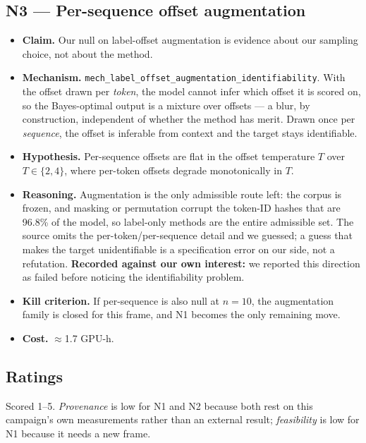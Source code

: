 \documentclass{article}
\begin{document}
\subsection{N3 --- Per-sequence offset augmentation}
\begin{itemize}
\item \textbf{Claim.} Our null on label-offset augmentation is evidence about our sampling choice, not about the method.
\item \textbf{Mechanism.} \texttt{mech\_label\_offset\_augmentation\_identifiability}. With the offset drawn per \emph{token}, the model cannot infer which offset it is scored on, so the Bayes-optimal output is a mixture over offsets --- a blur, by construction, independent of whether the method has merit. Drawn once per \emph{sequence}, the offset is inferable from context and the target stays identifiable.
\item \textbf{Hypothesis.} Per-sequence offsets are flat in the offset temperature $T$ over $T\in\{2,4\}$, where per-token offsets degrade monotonically in $T$.
\item \textbf{Reasoning.} Augmentation is the only admissible route left: the corpus is frozen, and masking or permutation corrupt the token-ID hashes that are 96.8\% of the model, so label-only methods are the entire admissible set. The source omits the per-token/per-sequence detail and we guessed; a guess that makes the target unidentifiable is a specification error on our side, not a refutation. \textbf{Recorded against our own interest:} we reported this direction as failed before noticing the identifiability problem.
\item \textbf{Kill criterion.} If per-sequence is also null at $n{=}10$, the augmentation family is closed for this frame, and N1 becomes the only remaining move.
\item \textbf{Cost.} $\approx$1.7 GPU-h.
\end{itemize}

\subsection{Ratings}
Scored 1--5. \emph{Provenance} is low for N1 and N2 because both rest on this campaign's own measurements rather than an external result; \emph{feasibility} is low for N1 because it needs a new frame.
\end{document}
